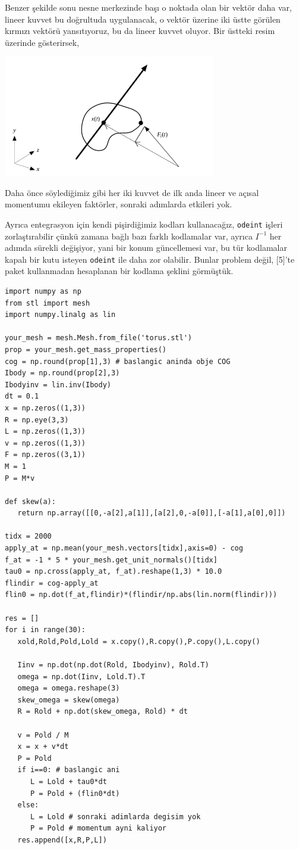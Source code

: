 \documentclass[12pt,fleqn]{article}\usepackage{../../common}
\begin{document}
Benzer şekilde sonu nesne merkezinde başı o noktada olan bir vektör daha var,
lineer kuvvet bu doğrultuda uygulanacak, o vektör üzerine iki üstte görülen
kırmızı vektörü yansıtıyoruz, bu da lineer kuvvet oluyor. Bir üstteki resim
üzerinde gösterirsek,

\includegraphics[width=25em]{phy_008_sim_rigbod_02.png}

Daha önce söylediğimiz gibi her iki kuvvet de ilk anda lineer ve açısal
momentumu ekileyen faktörler, sonraki adımlarda etkileri yok.

Ayrıca entegrasyon için kendi pişirdiğimiz kodları kullanacağız, \verb!odeint!
işleri zorlaştırabilir çünkü zamana bağlı bazı farklı kodlamalar var, ayrıca
$I^{-1}$ her adımda sürekli değişiyor, yani bir konum güncellemesi var, bu
tür kodlamalar kapalı bir kutu isteyen \verb!odeint! ile daha zor olabilir.
Bunlar problem değil, [5]'te paket kullanmadan hesaplanan bir
kodlama şeklini görmüştük.

\begin{verbatim}
import numpy as np
from stl import mesh
import numpy.linalg as lin

your_mesh = mesh.Mesh.from_file('torus.stl')   
prop = your_mesh.get_mass_properties()
cog = np.round(prop[1],3) # baslangic aninda obje COG
Ibody = np.round(prop[2],3)
Ibodyinv = lin.inv(Ibody)
dt = 0.1
x = np.zeros((1,3))
R = np.eye(3,3)
L = np.zeros((1,3))
v = np.zeros((1,3))
F = np.zeros((3,1))
M = 1
P = M*v

def skew(a):
   return np.array([[0,-a[2],a[1]],[a[2],0,-a[0]],[-a[1],a[0],0]])

tidx = 2000
apply_at = np.mean(your_mesh.vectors[tidx],axis=0) - cog
f_at = -1 * 5 * your_mesh.get_unit_normals()[tidx]
tau0 = np.cross(apply_at, f_at).reshape(1,3) * 10.0
flindir = cog-apply_at
flin0 = np.dot(f_at,flindir)*(flindir/np.abs(lin.norm(flindir)))

res = []
for i in range(30):
   xold,Rold,Pold,Lold = x.copy(),R.copy(),P.copy(),L.copy()
   
   Iinv = np.dot(np.dot(Rold, Ibodyinv), Rold.T)
   omega = np.dot(Iinv, Lold.T).T
   omega = omega.reshape(3)
   skew_omega = skew(omega)
   R = Rold + np.dot(skew_omega, Rold) * dt

   v = Pold / M
   x = x + v*dt
   P = Pold
   if i==0: # baslangic ani
      L = Lold + tau0*dt
      P = Pold + (flin0*dt)
   else:      
      L = Lold # sonraki adimlarda degisim yok
      P = Pold # momentum ayni kaliyor
   res.append([x,R,P,L])
\end{verbatim}
\end{document}
